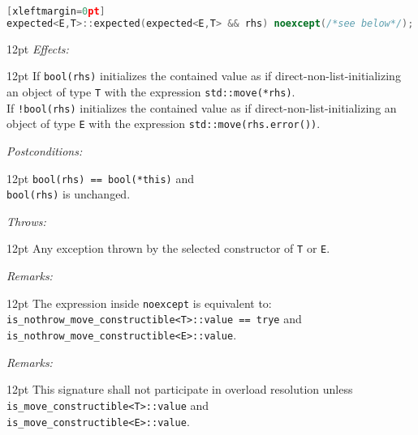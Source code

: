 \documentclass[a4paper,10pt]{article}
\newcommand{\cpp}[1]{\lstinline{#1}}
\newcommand{\wordingItem}[1]{\noindent\textit{#1:}}
\newenvironment{wordingTextItem}[1]{\wordingItem{#1}\vspace{2pt}\noindent\begin{adjustwidth}{12pt}{}}{\vspace{2pt}\end{adjustwidth}}
\newenvironment{wordingPara}{\begin{adjustwidth}{12pt}{}}{\end{adjustwidth}}
\begin{document}
\begin{lstlisting}[language=C++][xleftmargin=0pt]
expected<E,T>::expected(expected<E,T> && rhs) noexcept(/*see below*/);
\end{lstlisting}
\begin{wordingPara}
\begin{wordingTextItem}{Effects}
If \cpp{bool(rhs)} initializes the contained value as if direct-non-list-initializing an object of type \cpp{T} with the expression \cpp{std::move(*rhs)}. \\

\noindent
If \cpp{!bool(rhs)} initializes the contained value as if direct-non-list-initializing an object of type \cpp{E} with the expression \cpp{std::move(rhs.error())}.
\end{wordingTextItem}
\begin{wordingTextItem}{Postconditions}
\cpp{bool(rhs) == bool(*this)} and \\
\cpp{bool(rhs)} is unchanged.
\end{wordingTextItem}
\begin{wordingTextItem}{Throws}
Any exception thrown by the selected constructor of \cpp{T} or \cpp{E}.
\end{wordingTextItem}
\begin{wordingTextItem}{Remarks}
The expression inside \cpp{noexcept} is equivalent to:\\
\cpp{is_nothrow_move_constructible<T>::value == trye} and   \\
\cpp{is_nothrow_move_constructible<E>::value}.
\end{wordingTextItem}
\begin{wordingTextItem}{Remarks}
This signature shall not participate in overload resolution unless\\
\cpp{is_move_constructible<T>::value} and \\
\cpp{is_move_constructible<E>::value}.
\end{wordingTextItem}
\end{wordingPara}
\end{document}

